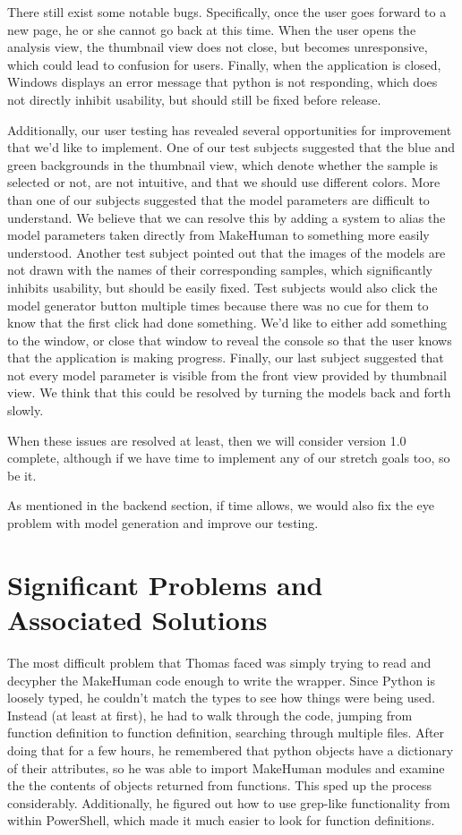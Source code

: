 \documentclass[letterpaper,10pt, onecolumn, draftclsnofoot]{IEEEtran}
\begin{document}
There still exist some notable bugs. Specifically, once the user goes forward to a new page, he or she cannot go back at this time. When the user opens the analysis view, the thumbnail view does not close, but becomes unresponsive, which could lead to confusion for users. Finally, when the application is closed, Windows displays an error message that python is not responding, which does not directly inhibit usability, but should still be fixed before release.

Additionally, our user testing has revealed several opportunities for improvement that we'd like to implement. One of our test subjects suggested that the blue and green backgrounds in the thumbnail view, which denote whether the sample is selected or not, are not intuitive, and that we should use different colors. More than one of our subjects suggested that the model parameters are difficult to understand. We believe that we can resolve this by adding a system to alias the model parameters taken directly from MakeHuman to something more easily understood. Another test subject pointed out that the images of the models are not drawn with the names of their corresponding samples, which significantly inhibits usability, but should be easily fixed. Test subjects would also click the model generator button multiple times because there was no cue for them to know that the first click had done something. We'd like to either add something to the window, or close that window to reveal the console so that the user knows that the application is making progress. Finally, our last subject suggested that not every model parameter is visible from the front view provided by thumbnail view. We think that this could be resolved by turning the models back and forth slowly.

When these issues are resolved at least, then we will consider version 1.0 complete, although if we have time to implement any of our stretch goals too, so be it.

As mentioned in the backend section, if time allows, we would also fix the eye problem with model generation and improve our testing.



\section{Significant Problems and Associated Solutions}

The most difficult problem that Thomas faced was simply trying to read and decypher the MakeHuman code enough to write the wrapper. Since Python is loosely typed, he couldn't match the types to see how things were being used. Instead (at least at first), he had to walk through the code, jumping from function definition to function definition, searching through multiple files. After doing that for a few hours, he remembered that python objects have a dictionary of their attributes, so he was able to import MakeHuman modules and examine the the contents of objects returned from functions. This sped up the process considerably. Additionally, he figured out how to use grep-like functionality from within PowerShell, which made it much easier to look for function definitions.
\end{document}
